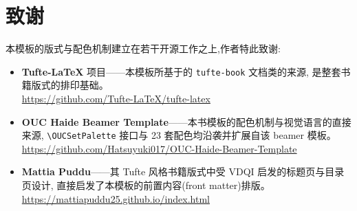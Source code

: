 
% 
% 


\chapter*{致谢}

本模板的版式与配色机制建立在若干开源工作之上,作者特此致谢:

\begin{itemize}
  \item \textbf{Tufte-LaTeX} 项目——本模板所基于的 \texttt{tufte-book} 文档类的来源,
    是整套书籍版式的排印基础。\\
    \url{https://github.com/Tufte-LaTeX/tufte-latex}
  \item \textbf{OUC Haide Beamer Template}——本书模板的配色机制与视觉语言的直接来源,
    \texttt{\textbackslash OUCSetPalette} 接口与 23 套配色均沿袭并扩展自该 beamer 模板。\\
    \url{https://github.com/Hatsuyuki017/OUC-Haide-Beamer-Template}
  \item \textbf{Mattia Puddu}——其 Tufte 风格书籍版式中受 VDQI 启发的标题页与目录页设计,
    直接启发了本模板的前置内容(front matter)排版。\\
    \url{https://mattiapuddu25.github.io/index.html}
\end{itemize}
